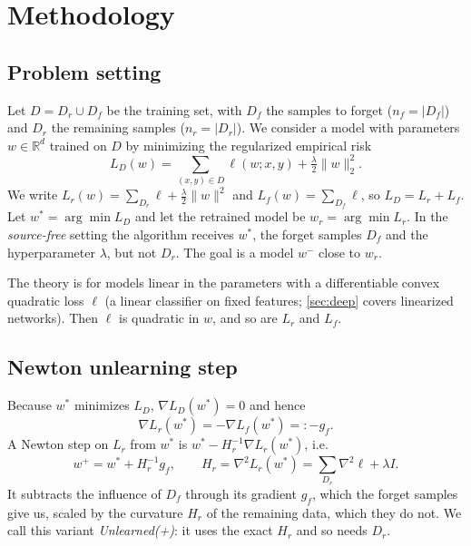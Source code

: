 \documentclass[10pt,twocolumn,letterpaper]{article}
\begin{document}
\section{Methodology}
\label{sec:method}
\subsection{Problem setting}
\label{sec:setting}
Let $D=D_r\cup D_f$ be the training set, with $D_f$ the samples to forget ($n_f=|D_f|$) and $D_r$ the remaining samples ($n_r=|D_r|$).
We consider a model with parameters $w\in\mathbb{R}^d$ trained on $D$ by minimizing the regularized empirical risk
\begin{equation}
  L_D(w)=\sum_{(x,y)\in D}\ell(w;x,y)+\tfrac{\lambda}{2}\|w\|_2^2 .
  \label{eq:train}
\end{equation}
We write $L_r(w)=\sum_{D_r}\ell+\tfrac{\lambda}{2}\|w\|^2$ and $L_f(w)=\sum_{D_f}\ell$, so $L_D=L_r+L_f$.
Let $w^*=\arg\min L_D$ and let the retrained model be $w_r=\arg\min L_r$.
In the \emph{source-free} setting the algorithm receives $w^*$, the forget samples $D_f$ and the hyperparameter $\lambda$, but not $D_r$.
The goal is a model $w^-$ close to $w_r$.

The theory is for models linear in the parameters with a differentiable convex quadratic loss $\ell$ (a linear classifier on fixed features; \cref{sec:deep} covers linearized networks).
Then $\ell$ is quadratic in $w$, and so are $L_r$ and $L_f$.

\subsection{Newton unlearning step}
\label{sec:newton}
Because $w^*$ minimizes $L_D$, $\nabla L_D(w^*)=0$ and hence
\begin{equation}
  \nabla L_r(w^*)=-\nabla L_f(w^*)=:-g_f .
  \label{eq:stationary}
\end{equation}
A Newton step on $L_r$ from $w^*$ is $w^*-H_r^{-1}\nabla L_r(w^*)$, i.e.
\begin{equation}
  w^{+}=w^*+H_r^{-1}g_f,\qquad H_r=\nabla^2L_r(w^*)=\sum_{D_r}\nabla^2\ell+\lambda I .
  \label{eq:newton}
\end{equation}
It subtracts the influence of $D_f$ through its gradient $g_f$, which the forget samples give us, scaled by the curvature $H_r$ of the remaining data, which they do not.
We call this variant \emph{Unlearned(+)}: it uses the exact $H_r$ and so needs $D_r$.
\end{document}
